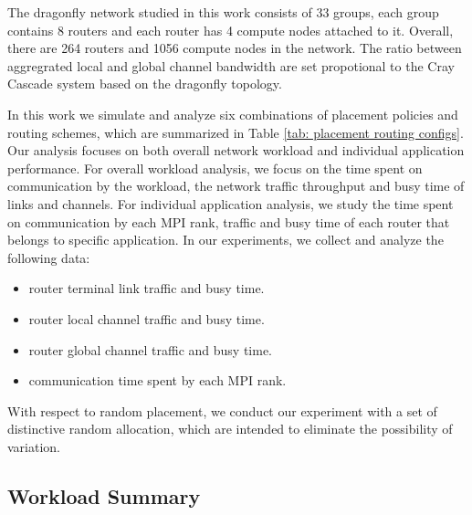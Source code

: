 \documentclass[conference,compsoc]{IEEEtran}
\begin{document}
The dragonfly network studied in this work consists of 33 groups, each group contains 8 routers and each router has 4 compute nodes attached to it. Overall, there are 264 routers and 1056 compute nodes in the network. The ratio between aggregrated local and global channel bandwidth are set propotional to the Cray Cascade system\cite{faanes} based on the dragonfly topology\cite{dally-dragonfly}.

In this work we simulate and analyze six combinations of placement policies and routing schemes, which are summarized in Table \ref{tab: placement routing configs}. Our analysis focuses on both overall network workload and individual application performance. For overall workload analysis, we focus on the time spent on communication by the workload, the network traffic throughput and busy time of links and channels. For individual application analysis, we study the time spent on communication by each MPI rank, traffic and busy time of each router that belongs to specific application. In our experiments, we collect and analyze the following data: 

\begin{itemize}
    \item router terminal link traffic and busy time.
    \item router local channel traffic and busy time.
    \item router global channel traffic and busy time.
    \item communication time spent by each MPI rank. 
\end{itemize}

With respect to random placement, we conduct our experiment with a set of distinctive random allocation, which are intended to eliminate the possibility of variation.

%
\subsection{Workload Summary}
\label{sec:workload summary}
\end{document}
